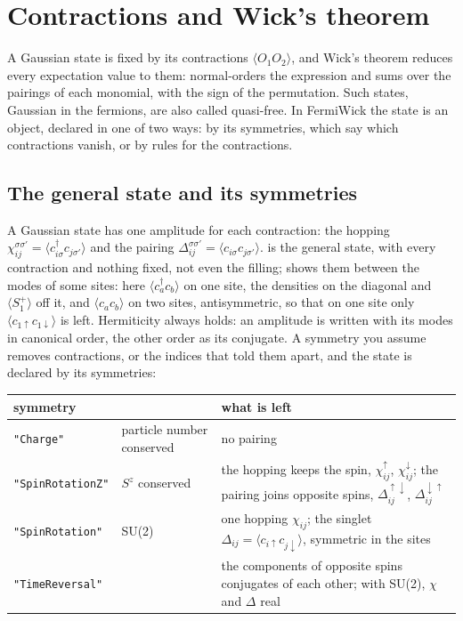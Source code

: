 \documentclass[11pt,a4paper]{article}
\begin{document}
\section{Contractions and Wick's theorem}
A Gaussian state is fixed by its contractions $\langle O_1O_2\rangle$, and Wick's theorem reduces every expectation value
to them:  normal-orders the expression and sums over the pairings of each monomial, with the sign of the
permutation. Such states, Gaussian in the fermions, are also called quasi-free. In FermiWick the state is an object, declared in one of two ways: by its symmetries, which say which
contractions vanish, or by rules for the contractions.

\subsection{The general state and its symmetries}
A Gaussian state has one amplitude for each contraction: the hopping
$\chi^{\sigma\sigma'}_{ij}=\langle c^\dagger_{i\sigma}c_{j\sigma'}\rangle$ and the pairing
$\Delta^{\sigma\sigma'}_{ij}=\langle c_{i\sigma}c_{j\sigma'}\rangle$.  is the general state, with every
contraction and nothing fixed, not even the filling;  shows them between the modes of some sites:
here $\langle c^\dagger_ac_b\rangle$ on one site, the densities on the diagonal and $\langle S^+_1\rangle$ off it, and
$\langle c_ac_b\rangle$ on two sites, antisymmetric, so that on one site only $\langle c_{1\uparrow}c_{1\downarrow}\rangle$ is left.
Hermiticity always holds: an amplitude is written with its modes in canonical order, the other order as its conjugate.
A symmetry you assume removes contractions, or the indices that told them apart, and the state is declared by its
symmetries:
\begin{center}\small
\begin{tabular}{llp{8.2cm}}\toprule
symmetry & & what is left \\ \midrule
\texttt{"Charge"} & particle number conserved & no pairing \\
\texttt{"SpinRotationZ"} & $S^z$ conserved & the hopping keeps the spin, $\chi^\uparrow_{ij}$, $\chi^\downarrow_{ij}$; the pairing joins
opposite spins, $\Delta^{\uparrow\downarrow}_{ij}$, $\Delta^{\downarrow\uparrow}_{ij}$ \\
\texttt{"SpinRotation"} & SU(2) & one hopping $\chi_{ij}$; the singlet $\Delta_{ij}=\langle c_{i\uparrow}c_{j\downarrow}\rangle$, symmetric in
the sites \\
\texttt{"TimeReversal"} & & the components of opposite spins conjugates of each other; with SU(2), $\chi$ and $\Delta$ real \\
\bottomrule
\end{tabular}
\end{center}
\end{document}
